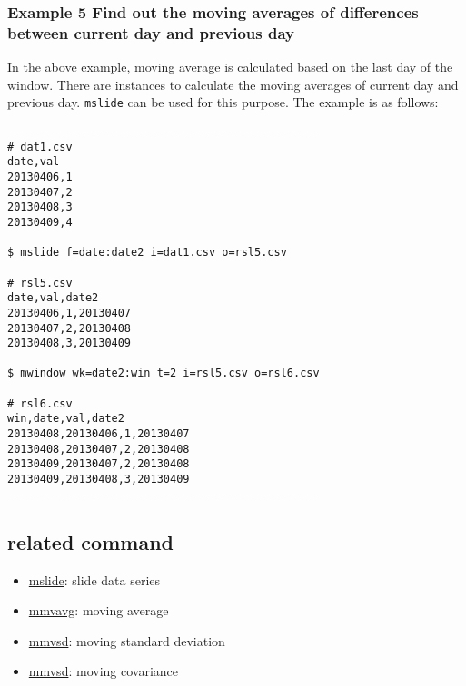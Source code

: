 \documentclass[a4paper]{jarticle}
\begin{document}
\subsubsection*{Example 5 Find out the moving averages of differences between current day and previous day  }
In the above example, moving average is calculated based on the last day of the window. There are instances to calculate the moving averages of current day and previous day. \verb|mslide| can be used for this purpose. The example is as follows:

\begin{verbatim}
------------------------------------------------
# dat1.csv
date,val
20130406,1
20130407,2
20130408,3
20130409,4

$ mslide f=date:date2 i=dat1.csv o=rsl5.csv

# rsl5.csv
date,val,date2
20130406,1,20130407
20130407,2,20130408
20130408,3,20130409

$ mwindow wk=date2:win t=2 i=rsl5.csv o=rsl6.csv

# rsl6.csv
win,date,val,date2
20130408,20130406,1,20130407
20130408,20130407,2,20130408
20130409,20130407,2,20130408
20130409,20130408,3,20130409
------------------------------------------------
\end{verbatim}

\subsection*{related command}
\begin{itemize}
\item \href{run:mslide.pdf}{mslide}: slide data series
\item \href{run:mmvavg.pdf}{mmvavg}: moving average
\item \href{run:mmvsd.pdf}{mmvsd}: moving standard deviation 
\item \href{run:mmvcorvar.pdf}{mmvsd}: moving covariance
\end{itemize}
\end{document}
